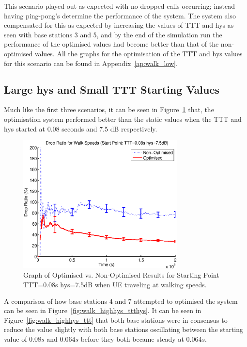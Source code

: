 This scenario played out as expected with no dropped calls occurring; instead having ping-pong’s determine the performance of the system. The system also compensated for this as expected by increasing the values of TTT and hys as seen with base stations 3 and 5, and by the end of the simulation run the performance of the optimised values had become better than that of the non-optimised values. All the graphs for the optimisation of the TTT and hys values for this scenario can be found in Appendix~\ref{ap:walk_low}.
\subsection{Large hys and Small TTT Starting Values}
Much like the first three scenarios, it can be seen in Figure~\ref{fig:walk_highhys_drop} that, the optimisation system performed better than the static values when the TTT and hys started at 0.08 seconds and 7.5 dB respectively.
\begin{figure}[H]
  \begin{center}
    	  \includegraphics[width=0.75\textwidth]{figures/walking_figures/walkhighhys.eps}
    \end{center}
    \caption{Graph of Optimised vs. Non-Optimised Results for Starting Point TTT=0.08s hys=7.5dB when UE traveling at walking speeds.}
    \label{fig:walk_highhys_drop}
\end{figure}
A comparison of how base stations 4 and 7 attempted to optimised the system can be seen in Figure~\ref{fig:walk_highhys_ttthys}. It can be seen in Figure~\ref{fig:walk_highhys_ttt} that both base stations were in consensus to reduce the value slightly with both base stations oscillating between the starting value of $0.08 s$ and $0.064 s$ before they both became steady at $0.064 s$.

